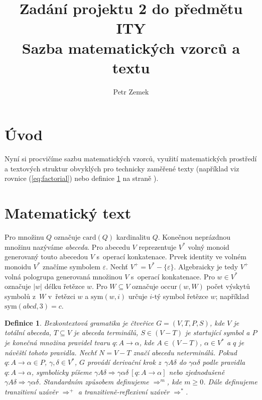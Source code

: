 \documentclass[10pt]{proc}
\theoremstyle{ity}
\newtheorem{thdef}[subsection]{Definice}
\begin{document}
\pagestyle{empty}

\title{\textbf{Zadání projektu 2 do předmětu ITY} \\ Sazba matematických vzorců a textu}
\author{Petr Zemek}

\maketitle

\section*{Úvod}

Nyní si procvičíme sazbu matematických vzorců, využití matematických prostředí a textových struktur obvyklých
pro technicky zaměřené texty (například viz rovnice (\ref{eq:factorial}) nebo definice \ref{def:cfg} na
straně \pageref{def:cfg}).

\section{Matematický text}

Pro množinu $Q$ označuje $\mathrm{card}(Q)$ kardinalitu $Q$. Konečnou neprázdnou množinu nazýváme
\emph{abeceda}. Pro abecedu $V$ reprezentuje $V^{*}$ volný monoid generovaný touto abecedou $V$ s~operací
konkatenace. Prvek identity ve volném monoidu $V^{*}$ značíme symbolem $\varepsilon$.
Nechť $V^{+} = V^{*} - \{\varepsilon\}$. Algebraicky je tedy $V^{+}$ volná pologrupa generovaná množinou $V$
s~operací konkatenace. Pro $w \in V^{*}$ označuje $|w|$ délku řetězce $w$.
Pro $W \subseteq V$ označuje $\mathrm{occur}(w, W)$ počet výskytů symbolů z~$W$ v~řetězci $w$ a
$\mathrm{sym}(w, i)$ určuje $i$-tý symbol řetězce $w$; například $\mathrm{sym}(abcd, 3) = c$.

\begin{thdef}
	\label{def:cfg}
	\emph{Bezkontextová gramatika} je čtveřice $G = (V, T, P, S)$, kde $V$ je totální abeceda,
	$T \subseteq V$ je abeceda terminálů, $S \in (V - T)$ je startující symbol a $P$ je konečná množina
	\emph{pravidel}	tvaru $q \colon A \rightarrow \alpha$, kde $A \in (V - T)$, $\alpha \in V^{*}$ a $q$ je
	návěští tohoto pravidla. Nechť $N = V - T$ značí abecedu neterminálů.
	Pokud $q \colon A \rightarrow \alpha \in P$, $\gamma, \delta \in V^{*}$, $G$ provádí derivační krok
	z~$\gamma A \delta$ do $\gamma \alpha \delta$ podle pravidla $q \colon A \rightarrow \alpha$, symbolicky
	píšeme $\gamma A \delta \Rightarrow \gamma \alpha \delta \ [q \colon A \rightarrow \alpha]$ nebo
	zjednodušeně $\gamma A \delta \Rightarrow \gamma \alpha \delta$.
	Standardním způsobem definujeme $\Rightarrow^{m}$, kde $m \geq 0$. Dále definujeme tranzitivní uzávěr
	$\Rightarrow^{+}$ a tranzitivně-reflexivní uzávěr $\Rightarrow^{*}$.
\end{thdef}
\end{document}
